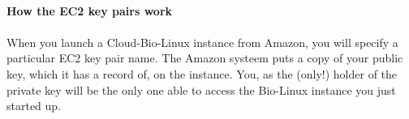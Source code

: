 \paragraph{How the EC2 key pairs work}

\paragraph{}When you launch a Cloud-Bio-Linux instance from  Amazon, you will specify a particular EC2 key pair name. The Amazon systeem puts a copy of your public key, which it has a record of, on the instance. You, as the (only!) holder of the private key will be the only one able to access the Bio-Linux instance you just started up. 



